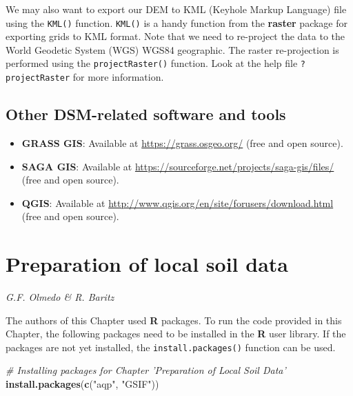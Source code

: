 \documentclass[10pt,b5paper,]{book}
\newenvironment{Shaded}{\begin{snugshade}}{\end{snugshade}}
\newcommand{\CommentTok}[1]{\textcolor[rgb]{0.56,0.35,0.01}{\textit{#1}}}
\newcommand{\KeywordTok}[1]{\textcolor[rgb]{0.13,0.29,0.53}{\textbf{#1}}}
\newcommand{\NormalTok}[1]{#1}
\newcommand{\StringTok}[1]{\textcolor[rgb]{0.31,0.60,0.02}{#1}}
\providecommand{\tightlist}{%
  \setlength{\itemsep}{0pt}\setlength{\parskip}{0pt}}
\theoremstyle{definition}
\theoremstyle{definition}
\theoremstyle{definition}
\theoremstyle{remark}
\begin{document}
We may also want to export our DEM to KML (Keyhole Markup Language) file
using the \texttt{KML()} function. \texttt{KML()} is a handy function
from the \textbf{raster} package for exporting grids to KML format. Note
that we need to re-project the data to the World Geodetic System (WGS)
WGS84 geographic. The raster re-projection is performed using the
\texttt{projectRaster()} function. Look at the help file
\texttt{?projectRaster} for more information.

\hypertarget{other-dsm-related-software-and-tools}{%
\section{Other DSM-related software and
tools}\label{other-dsm-related-software-and-tools}}

\begin{itemize}
\tightlist
\item
  \textbf{GRASS GIS}: Available at \url{https://grass.osgeo.org/} (free
  and open source).
\item
  \textbf{SAGA GIS}: Available at
  \url{https://sourceforge.net/projects/saga-gis/files/} (free and open
  source).
\item
  \textbf{QGIS}: Available at
  \url{http://www.qgis.org/en/site/forusers/download.html} (free and
  open source).
\end{itemize}

\hypertarget{preparation}{%
\chapter{Preparation of local soil data}\label{preparation}}

\emph{G.F. Olmedo \& R. Baritz}

The authors of this Chapter used \textbf{R} packages. To run the code
provided in this Chapter, the following packages need to be installed in
the \textbf{R} user library. If the packages are not yet installed, the
\texttt{install.packages()} function can be used.

\begin{Shaded}
\begin{Highlighting}[]
\CommentTok{# Installing packages for Chapter 'Preparation of Local Soil Data'}
\KeywordTok{install.packages}\NormalTok{(}\KeywordTok{c}\NormalTok{(}\StringTok{"aqp"}\NormalTok{, }\StringTok{"GSIF"}\NormalTok{))}
\end{Highlighting}
\end{Shaded}
\end{document}
